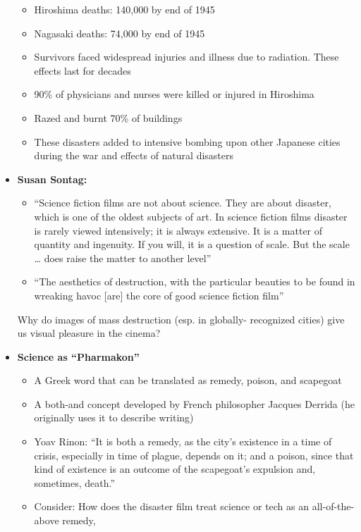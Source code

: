 \documentclass[11pt,fleqn]{book} %
\begin{document}
\begin{itemize}
\begin{itemize}
        \item Hiroshima deaths: 140,000 by end of 1945
        \item Nagasaki deaths: 74,000 by end of 1945
        \item Survivors faced widespread injuries and illness due to radiation. These effects last for decades
        \item 90\% of physicians and nurses were killed or injured in Hiroshima
        \item Razed and burnt 70\% of buildings
        \item These disasters added to intensive bombing upon other Japanese cities during the
war and effects of natural disasters
    \end{itemize}
    \item \textbf{Susan Sontag:}
    \begin{itemize}
        \item \enquote{Science fiction films are not about science. They are about disaster, which is
one of the oldest subjects of art. In science fiction films disaster is rarely
viewed intensively; it is always extensive. It is a matter of quantity and
ingenuity. If you will, it is a question of scale. But the scale … does raise the
matter to another level}
        \item \enquote{The aesthetics of destruction, with the particular beauties to be found in
wreaking havoc [are] the core of good science fiction film}
    \end{itemize}
    \begin{remark}
        Why do images of mass destruction (esp. in globally-
recognized cities) give us visual pleasure in the cinema?
    \end{remark}
    \item \textbf{Science as \enquote{Pharmakon}}
    \begin{itemize}
        \item A Greek word that can be translated as remedy, poison, and scapegoat
        \item A both-and concept developed by French philosopher Jacques Derrida (he originally uses it to describe writing)
        \item Yoav Rinon: \enquote{It is both a remedy, as the city's existence in a time of crisis, especially in time of plague,
depends on it; and a poison, since that kind of existence is an outcome of the scapegoat's
expulsion and, sometimes, death.}
        \item Consider: How does the disaster film treat science or tech as an all-of-the-above remedy,

\end{itemize}
\end{itemize}
\end{document}
